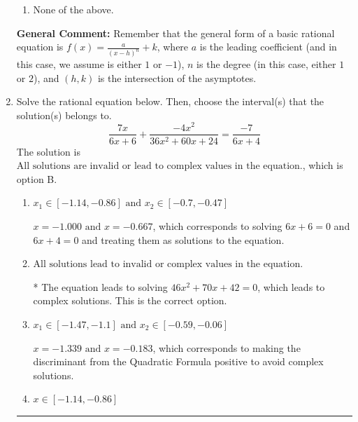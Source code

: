 \documentclass{extbook}[14pt]
\newcommand{\litem}[1]{\item #1

\rule{\textwidth}{0.4pt}}
\begin{document}
\begin{enumerate}
{\begin{enumerate}[label=\Alph*.]
\item None of the above.\end{enumerate}
\textbf{General Comment:} Remember that the general form of a basic rational equation is $ f(x) = \frac{a}{(x-h)^n} + k$, where $a$ is the leading coefficient (and in this case, we assume is either $1$ or $-1$), $n$ is the degree (in this case, either $1$ or $2$), and $(h, k)$ is the intersection of the asymptotes.
}
\litem{
Solve the rational equation below. Then, choose the interval(s) that the solution(s) belongs to.
\[ \frac{7x}{6x + 6} + \frac{-4x^{2}}{36x^{2} +60 x + 24} = \frac{-7}{6x + 4} \]The solution is \( \text{All solutions are invalid or lead to complex values in the equation.} \), which is option B.\begin{enumerate}[label=\Alph*.]
\item \( x_1 \in [-1.14, -0.86] \text{ and } x_2 \in [-0.7,-0.47] \)

$x = -1.000 \text{ and } x = -0.667$, which corresponds to solving $6x + 6 = 0$ and $6x + 4 = 0$ and treating them as solutions to the equation.
\item \( \text{All solutions lead to invalid or complex values in the equation.} \)

* The equation leads to solving $46x^{2} +70 x + 42=0$, which leads to complex solutions. This is the correct option.
\item \( x_1 \in [-1.47, -1.1] \text{ and } x_2 \in [-0.59,-0.06] \)

$x = -1.339 \text{ and } x = -0.183$, which corresponds to making the discriminant from the Quadratic Formula positive to avoid complex solutions.
\item \( x \in [-1.14,-0.86] \)


\end{enumerate}}
\end{enumerate}
\end{document}

